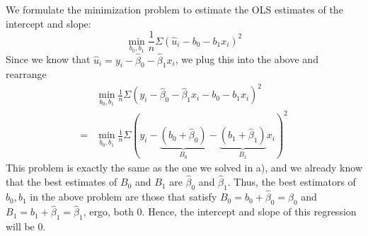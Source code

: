 \documentclass[
]{article}
\begin{document}
\begin{enumerate}
We formulate the minimization problem to estimate the OLS estimates of the intercept and slope: 
\[\min _{b_0, b_1} \frac{1}{n}\Sigma(\hat{u}_i-b_0-b_1 x_i)^2\]
Since we know that $\hat{u}_i = y_i - \hat{\beta}_0 - \hat{\beta}_1 x_i$, we plug this into the above and rearrange
\[\begin{aligned}
&\min _{b_0, b_1} \frac{1}{n}\Sigma(y_i - \hat{\beta}_0 - \hat{\beta}_1 x_i-b_0-b_1 x_i)^2 \\
=& \min _{b_0, b_1} \frac{1}{n}\Sigma(y_i - \underbrace{(b_0 + \hat{\beta}_0)}_{B_0} - \underbrace{(b_1 + \hat{\beta}_1)}_{B_1} x_i)^2
\end{aligned}\]
This problem is exactly the same as the one we solved in a), and we already know that the best estimates of $B_0$ and $B_1$ are $\hat{\beta}_0$ and $\hat{\beta}_1$. Thus, the best estimators of $b_0, b_1$ in the above problem are those that satisfy $B_0 = b_0 + \hat{\beta}_0 = \hat{\beta}_0$ and $B_1 = b_1 + \hat{\beta}_1 = \hat{\beta}_1$, ergo, both $0$. Hence, the intercept and slope of this regression will be $0$. 

\end{enumerate}
\end{document}
